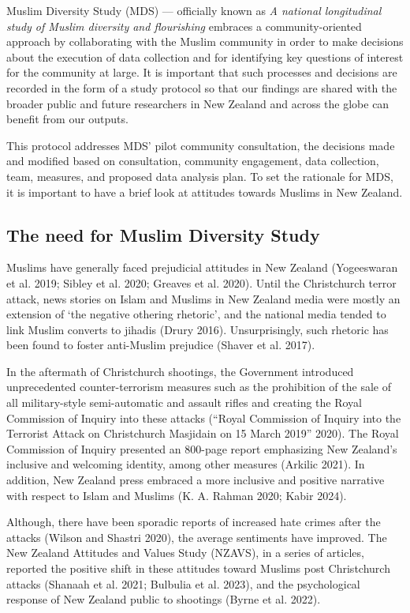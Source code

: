 \documentclass[
]{interact}
\begin{document}
Muslim Diversity Study (MDS) --- officially known as \emph{A national
longitudinal study of Muslim diversity and flourishing} embraces a
community-oriented approach by collaborating with the Muslim community
in order to make decisions about the execution of data collection and
for identifying key questions of interest for the community at large. It
is important that such processes and decisions are recorded in the form
of a study protocol so that our findings are shared with the broader
public and future researchers in New Zealand and across the globe can
benefit from our outputs.

This protocol addresses MDS' pilot community consultation, the decisions
made and modified based on consultation, community engagement, data
collection, team, measures, and proposed data analysis plan. To set the
rationale for MDS, it is important to have a brief look at attitudes
towards Muslims in New Zealand.

\subsection{The need for Muslim Diversity
Study}\label{the-need-for-muslim-diversity-study}

Muslims have generally faced prejudicial attitudes in New Zealand
(Yogeeswaran et al. 2019; Sibley et al. 2020; Greaves et al. 2020).
Until the Christchurch terror attack, news stories on Islam and Muslims
in New Zealand media were mostly an extension of `the negative othering
rhetoric', and the national media tended to link Muslim converts to
jihadis (Drury 2016). Unsurprisingly, such rhetoric has been found to
foster anti-Muslim prejudice (Shaver et al. 2017).

In the aftermath of Christchurch shootings, the Government introduced
unprecedented counter-terrorism measures such as the prohibition of the
sale of all military-style semi-automatic and assault rifles and
creating the Royal Commission of Inquiry into these attacks ({``Royal
{C}ommission of {I}nquiry into the Terrorist Attack on {C}hristchurch
{M}asjidain on 15 {M}arch 2019''} 2020). The Royal Commission of Inquiry
presented an 800-page report emphasizing New Zealand's inclusive and
welcoming identity, among other measures (Arkilic 2021). In addition,
New Zealand press embraced a more inclusive and positive narrative with
respect to Islam and Muslims (K. A. Rahman 2020; Kabir 2024).

Although, there have been sporadic reports of increased hate crimes
after the attacks (Wilson and Shastri 2020), the average sentiments have
improved. The New Zealand Attitudes and Values Study (NZAVS), in a
series of articles, reported the positive shift in these attitudes
toward Muslims post Christchurch attacks (Shanaah et al. 2021; Bulbulia
et al. 2023), and the psychological response of New Zealand public to
shootings (Byrne et al. 2022).
\end{document}
